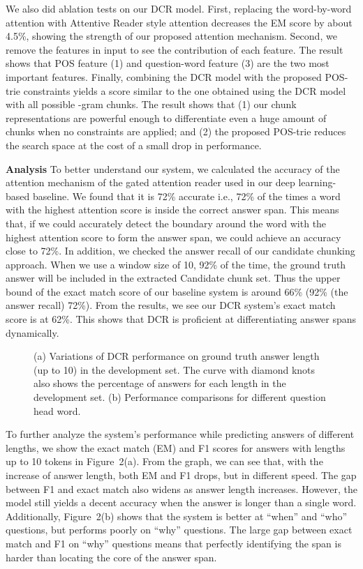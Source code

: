\documentclass[letterpaper]{article}
\begin{document}
We also did ablation tests on our DCR model. First, replacing the word-by-word attention with Attentive Reader style attention \cite{hermann2015teaching} decreases the EM score by about 4.5\%, showing the strength of our proposed attention mechanism. 
Second, we remove the features in input to see the contribution of each feature. The result shows that POS feature (1) and question-word feature (3) are the two most important features.
Finally, combining the DCR model with the proposed POS-trie constraints yields a score similar to the one obtained using the DCR model with all possible -gram chunks. The result shows that (1) our chunk representations are powerful enough to differentiate even a huge amount of chunks when no constraints are applied; and (2) the proposed POS-trie reduces the search space at the cost of a small drop in performance.

\noindent\textbf{Analysis}
To better understand our system, we calculated the accuracy of the attention mechanism of the gated attention reader used in our deep learning-based baseline. We found that it is 72\% accurate i.e., 72\% of the times a word with the highest attention score is inside the correct answer span. This means that, if we could accurately detect the boundary around the word with the highest attention score to form the answer span, we could achieve an accuracy close to 72\%.
In addition, we checked the answer recall of our candidate chunking approach. When we use a window size of 10, 92\% of the time, the ground truth answer will be included in the extracted Candidate chunk set. 
Thus the upper bound of the exact match score of our baseline system is around 66\% (92\% (the answer recall)  72\%). From the results, we see our DCR system's exact match score is at 62\%. This shows that DCR is proficient at differentiating answer spans dynamically.

\begin{figure}
\begin{center}
\caption{(a) Variations of DCR performance on ground truth answer length (up to 10) in the development set. The curve with diamond knots also shows the percentage of answers for each length in the development set. (b) Performance comparisons for different question head word.}
\label{fig_stat}
\end{center}
\end{figure}

To further analyze the system's performance while predicting answers of different lengths, we show the exact match (EM) and F1 scores for answers with lengths up to 10 tokens in Figure~2(a). From the graph, we can see that, with the increase of answer length, both EM and F1 drops, but in different speed. The gap between F1 and exact match also widens as answer length increases. However, the model still yields a decent accuracy when the answer is longer than a single word. Additionally, Figure~2(b) shows that the system is better at ``when'' and ``who'' questions, but performs poorly on ``why'' questions. The large gap between exact match and F1 on ``why'' questions means that perfectly identifying the span is harder than locating the core of the answer span.
\end{document}
